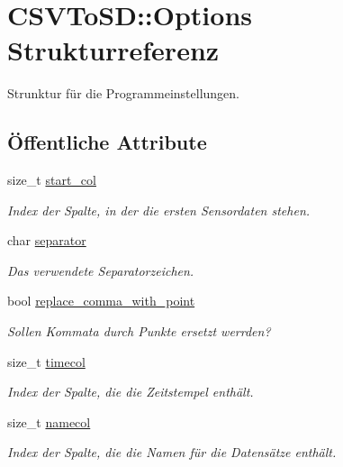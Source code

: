 \hypertarget{structCSVToSD_1_1Options}{\section{C\-S\-V\-To\-S\-D\-:\-:Options Strukturreferenz}
\label{structCSVToSD_1_1Options}
}


Strunktur für die Programmeinstellungen.  


\subsection*{Öffentliche Attribute}
\begin{DoxyCompactItemize}
\item 
size\-\_\-t \hyperlink{structCSVToSD_1_1Options_a70d85339b25b5fa4db8750fb78203e5e}{start\-\_\-col}
\begin{DoxyCompactList}\small\item\em Index der Spalte, in der die ersten Sensordaten stehen. \end{DoxyCompactList}\item 
char \hyperlink{structCSVToSD_1_1Options_afa7a79f38999d3c89f7ffa67f74bfbd4}{separator}
\begin{DoxyCompactList}\small\item\em Das verwendete Separatorzeichen. \end{DoxyCompactList}\item 
bool \hyperlink{structCSVToSD_1_1Options_ab0204127a812664cc4bef7db1032ea99}{replace\-\_\-comma\-\_\-with\-\_\-point}
\begin{DoxyCompactList}\small\item\em Sollen Kommata durch Punkte ersetzt werrden? \end{DoxyCompactList}\item 
size\-\_\-t \hyperlink{structCSVToSD_1_1Options_a1ffaee2ce48d0c2b8db1eaca858cdbc0}{timecol}
\begin{DoxyCompactList}\small\item\em Index der Spalte, die die Zeitstempel enthält. \end{DoxyCompactList}\item 
size\-\_\-t \hyperlink{structCSVToSD_1_1Options_a5195fcf1eced54268d6496c1640165af}{namecol}
\begin{DoxyCompactList}\small\item\em Index der Spalte, die die Namen für die Datensätze enthält. \end{DoxyCompactList}\item 

\end{DoxyCompactItemize}

